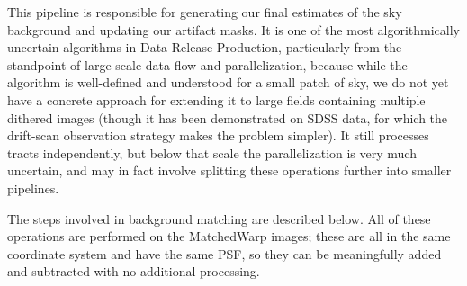 This pipeline is responsible for generating our final estimates of the sky background and updating our artifact masks.  It is one of the most algorithmically uncertain algorithms in Data Release Production, particularly from the standpoint of large-scale data flow and parallelization, because while the algorithm is well-defined and understood for a small patch of sky, we do not yet have a concrete approach for extending it to large fields containing multiple dithered images (though it has been demonstrated on SDSS data, for which the drift-scan observation strategy makes the problem simpler).  It still processes tracts independently, but below that scale the parallelization is very much uncertain, and may in fact involve splitting these operations further into smaller pipelines.

The steps involved in background matching are described below.  All of these operations are performed on the MatchedWarp images; these are all in the same coordinate system and have the same PSF, so they can be meaningfully added and subtracted with no additional processing.
